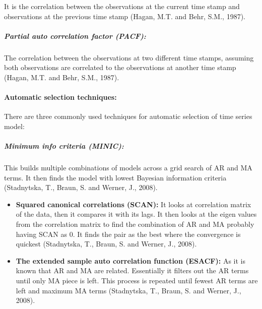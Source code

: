 \documentclass[
  letterpaper,
  DIV=11,
  numbers=noendperiod]{scrartcl}
\let\oldparagraph\paragraph
\renewcommand{\paragraph}[1]{\oldparagraph{#1}\mbox{}}
\let\oldsubparagraph\subparagraph
\renewcommand{\subparagraph}[1]{\oldsubparagraph{#1}\mbox{}}
\begin{document}
It is the correlation between the observations at the current time stamp
and observations at the previous time stamp (Hagan, M.T. and Behr, S.M.,
1987).

\hypertarget{partial-auto-correlation-factor-pacf}{%
\subparagraph{\texorpdfstring{\textbf{Partial auto correlation factor
(PACF):}}{Partial auto correlation factor (PACF):}}\label{partial-auto-correlation-factor-pacf}}

The correlation between the observations at two different time stamps,
assuming both observations are correlated to the observations at another
time stamp (Hagan, M.T. and Behr, S.M., 1987).

\hypertarget{automatic-selection-techniques}{%
\paragraph{\texorpdfstring{\textbf{Automatic selection
techniques:}}{Automatic selection techniques:}}\label{automatic-selection-techniques}}

There are three commonly used techniques for automatic selection of time
series model:

\hypertarget{minimum-info-criteria-minic}{%
\subparagraph{\texorpdfstring{\textbf{Minimum info criteria
(MINIC):}}{Minimum info criteria (MINIC):}}\label{minimum-info-criteria-minic}}

This builds multiple combinations of models across a grid search of AR
and MA terms. It then finds the model with lowest Bayesian information
criteria (Stadnytska, T., Braun, S. and Werner, J., 2008).

\begin{itemize}
\item
  \textbf{Squared canonical correlations (SCAN):} It looks at
  correlation matrix of the data, then it compares it with its lags. It
  then looks at the eigen values from the correlation matrix to find the
  combination of AR and MA probably having SCAN as 0. It finds the pair
  as the best where the convergence is quickest (Stadnytska, T., Braun,
  S. and Werner, J., 2008).
\item
  \textbf{The extended sample auto correlation function (ESACF):} As it
  is known that AR and MA are related. Essentially it filters out the AR
  terms until only MA piece is left. This process is repeated until
  fewest AR terms are left and maximum MA terms (Stadnytska, T., Braun,
  S. and Werner, J., 2008).
\end{itemize}
\end{document}
